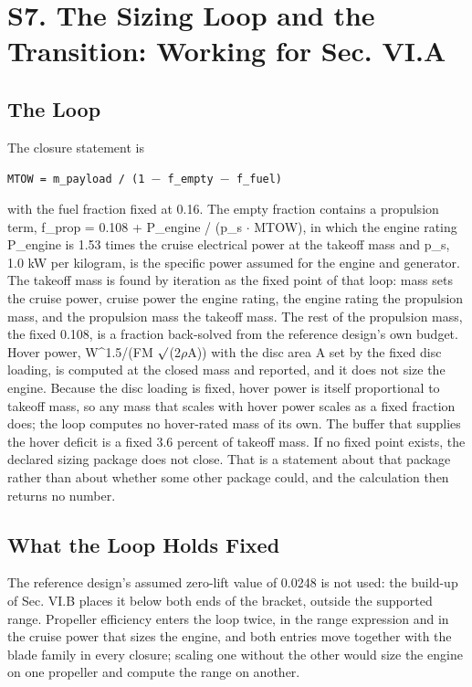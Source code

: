 \documentclass[journal]{new-aiaa}
\begin{document}
\section*{S7. The Sizing Loop and the Transition: Working for Sec. VI.A}

\subsection*{The Loop}

The closure statement is

\begin{center}
\texttt{MTOW = m\_payload / (1 $-$ f\_empty $-$ f\_fuel)}
\end{center}

with the fuel fraction fixed at 0.16. The empty fraction contains a propulsion term, f\_prop = 0.108 + P\_engine / (p\_s $\cdot$ MTOW), in which the engine rating P\_engine is 1.53 times the cruise electrical power at the takeoff mass and p\_s, 1.0 kW per kilogram, is the specific power assumed for the engine and generator. The takeoff mass is found by iteration as the fixed point of that loop: mass sets the cruise power, cruise power the engine rating, the engine rating the propulsion mass, and the propulsion mass the takeoff mass. The rest of the propulsion mass, the fixed 0.108, is a fraction back-solved from the reference design's own budget. Hover power, W\^{}1.5/(FM $\surd$(2$\rho$A)) with the disc area A set by the fixed disc loading, is computed at the closed mass and reported, and it does not size the engine. Because the disc loading is fixed, hover power is itself proportional to takeoff mass, so any mass that scales with hover power scales as a fixed fraction does; the loop computes no hover-rated mass of its own. The buffer that supplies the hover deficit is a fixed 3.6 percent of takeoff mass. If no fixed point exists, the declared sizing package does not close. That is a statement about that package rather than about whether some other package could, and the calculation then returns no number.

\subsection*{What the Loop Holds Fixed}

The reference design's assumed zero-lift value of 0.0248 is not used: the build-up of Sec. VI.B places it below both ends of the bracket, outside the supported range. Propeller efficiency enters the loop twice, in the range expression and in the cruise power that sizes the engine, and both entries move together with the blade family in every closure; scaling one without the other would size the engine on one propeller and compute the range on another.
\end{document}
